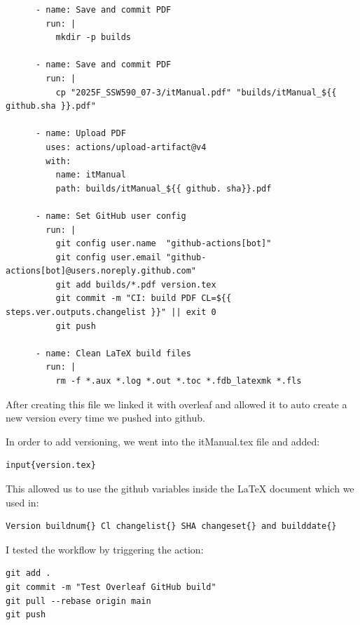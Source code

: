 \begin{verbatim}
      - name: Save and commit PDF
        run: |
          mkdir -p builds

      - name: Save and commit PDF
        run: |
          cp "2025F_SSW590_07-3/itManual.pdf" "builds/itManual_${{ github.sha }}.pdf"

      - name: Upload PDF
        uses: actions/upload-artifact@v4
        with:
          name: itManual
          path: builds/itManual_${{ github. sha}}.pdf

      - name: Set GitHub user config
        run: |
          git config user.name  "github-actions[bot]"
          git config user.email "github-actions[bot]@users.noreply.github.com"
          git add builds/*.pdf version.tex
          git commit -m "CI: build PDF CL=${{ steps.ver.outputs.changelist }}" || exit 0
          git push

      - name: Clean LaTeX build files
        run: |
          rm -f *.aux *.log *.out *.toc *.fdb_latexmk *.fls
\end{verbatim}

After creating this file we linked it with overleaf and allowed it to auto create a new version every time we pushed into github. 

In order to add versioning, we went into the itManual.tex file and added:
\begin{verbatim}
input{version.tex}
\end{verbatim}

This allowed us to use the github variables inside the LaTeX document which we used in:

\begin{verbatim}
Version buildnum{} Cl changelist{} SHA changeset{} and builddate{}
\end{verbatim}

I tested the workflow by triggering the action:
\begin{verbatim}
git add .
git commit -m "Test Overleaf GitHub build"
git pull --rebase origin main
git push
\end{verbatim}

\\



